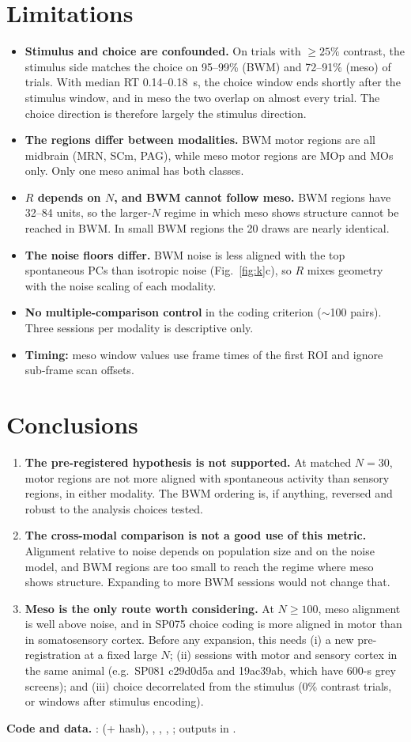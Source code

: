 \documentclass[10pt]{article}
\begin{document}
\section{Limitations}
\begin{itemize}
  \item \textbf{Stimulus and choice are confounded.} On trials with $\ge 25\%$ contrast, the stimulus side matches the choice on 95--99\% (BWM) and 72--91\% (meso) of trials. With median RT 0.14--0.18~s, the choice window ends shortly after the stimulus window, and in meso the two overlap on almost every trial. The choice direction is therefore largely the stimulus direction.
  \item \textbf{The regions differ between modalities.} BWM motor regions are all midbrain (MRN, SCm, PAG), while meso motor regions are MOp and MOs only. Only one meso animal has both classes.
  \item \textbf{$R$ depends on $N$, and BWM cannot follow meso.} BWM regions have 32--84 units, so the larger-$N$ regime in which meso shows structure cannot be reached in BWM. In small BWM regions the 20 draws are nearly identical.
  \item \textbf{The noise floors differ.} BWM noise is less aligned with the top spontaneous PCs than isotropic noise (Fig.~\ref{fig:k}c), so $R$ mixes geometry with the noise scaling of each modality.
  \item \textbf{No multiple-comparison control} in the coding criterion ($\sim$100 pairs). Three sessions per modality is descriptive only.
  \item \textbf{Timing:} meso window values use frame times of the first ROI and ignore sub-frame scan offsets.
\end{itemize}

\section{Conclusions}
\begin{enumerate}
  \item \textbf{The pre-registered hypothesis is not supported.} At matched $N=30$, motor regions are not more aligned with spontaneous activity than sensory regions, in either modality. The BWM ordering is, if anything, reversed and robust to the analysis choices tested.
  \item \textbf{The cross-modal comparison is not a good use of this metric.} Alignment relative to noise depends on population size and on the noise model, and BWM regions are too small to reach the regime where meso shows structure. Expanding to more BWM sessions would not change that.
  \item \textbf{Meso is the only route worth considering.} At $N\ge 100$, meso alignment is well above noise, and in SP075 choice coding is more aligned in motor than in somatosensory cortex. Before any expansion, this needs (i) a new pre-registration at a fixed large $N$; (ii) sessions with motor and sensory cortex in the same animal (e.g.\ SP081 c29d0d5a and 19ac39ab, which have 600-s grey screens); and (iii) choice decorrelated from the stimulus (0\% contrast trials, or windows after stimulus encoding).
\end{enumerate}

\textbf{Code and data.} :  (+ hash), , , , ; outputs in .
\end{document}
